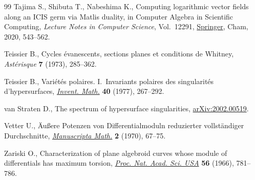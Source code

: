 \begin{thebibliography}{99}
Tajima S., Shibuta T., Nabeshima K., Computing logarithmic vector fields along
 an {ICIS} germ via {M}atlis duality, in Computer Algebra in Scientific
 Computing, \textit{Lecture Notes in Computer Science}, Vol.~12291, \href{https://doi.org/10.1007/978-3-030-60026-6_32}{Springer},
 Cham, 2020, 543--562.

Teissier B., Cycles \'evanescents, sections planes et conditions de {W}hitney,
 \textit{Ast\'erisque} \textbf{7} (1973), 285--362.

Teissier B., Vari\'et\'es polaires. {I}.~{I}nvariants polaires des
 singularit\'es d'hypersurfaces, \href{https://doi.org/10.1007/BF01425742}{\textit{Invent. Math.}} \textbf{40} (1977),
 267--292.

van Straten D., The spectrum of hypersurface singularities,
 \href{https://arxiv.org/abs/2002.00519}{arXiv:2002.00519}.

Vetter U., \"Au{\ss}ere {P}otenzen von {D}ifferentialmoduln reduzierter
 vollst\"andiger {D}urchschnitte, \href{https://doi.org/10.1007/BF01168480}{\textit{Manuscripta Math.}} \textbf{2}
 (1970), 67--75.

Zariski O., Characterization of plane algebroid curves whose module of
 differentials has maximum torsion, \href{https://doi.org/10.1073/pnas.56.3.781}{\textit{Proc. Nat. Acad. Sci. USA}}
 \textbf{56} (1966), 781--786.

\end{thebibliography}
